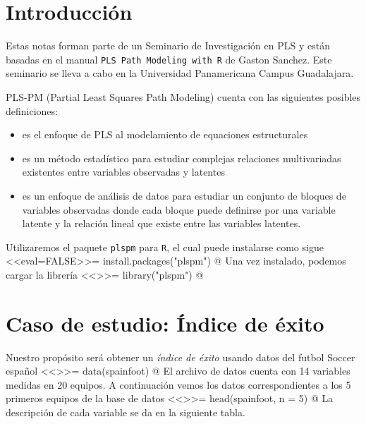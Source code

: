 

\maketitle

\section{Introducci\'on}

Estas notas forman parte de un Seminario de Investigaci\'on en PLS y est\'an basadas en el manual \texttt{PLS Path Modeling with R} de Gaston Sanchez. Este seminario se lleva a cabo en la Universidad Panamericana Campus Guadalajara. 

PLS-PM (Partial Least Squares Path Modeling) cuenta con las siguientes posibles definiciones:
\begin{itemize}
  \item es el enfoque de PLS al modelamiento de equaciones estructurales
  \item es un m\'etodo estad\'istico para estudiar complejas relaciones multivariadas existentes entre variables observadas y latentes
  \item es un enfoque de an\'alisis de datos para estudiar un conjunto de bloques de variables observadas donde cada bloque puede definirse por una variable latente y la relaci\'on lineal que existe entre las variables latentes.
\end{itemize}

Utilizaremos el paquete \texttt{plspm} para \texttt{R}, el cual puede instalarse como sigue
<<eval=FALSE>>=
install.packages("plspm")
@
Una vez instalado, podemos cargar la librer\'ia
<<>>=
library("plspm")
@

\section{Caso de estudio: \'Indice de \'exito}

Nuestro prop\'osito ser\'a obtener un \emph{\'indice de \'exito} usando datos del futbol Soccer espa\~nol
<<>>=
data(spainfoot)
@
El archivo de datos cuenta con 14 variables medidas en 20 equipos. A continuaci\'on vemos los datos correspondientes a los 5 primeros equipos de la base de datos
<<>>=
head(spainfoot, n = 5)
@
La descripci\'on de cada variable se da en la siguiente tabla.


